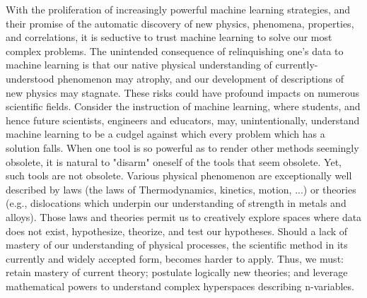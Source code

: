 With the proliferation of increasingly powerful machine learning strategies, and their promise of the automatic discovery of new physics, phenomena, properties, and correlations, it is seductive to trust machine learning to solve our most complex problems. The unintended consequence of relinquishing one's data to machine learning is that our native physical understanding of currently-understood phenomenon may atrophy, and our development of descriptions of new physics may stagnate.  These risks could have profound impacts on numerous scientific fields. Consider the instruction of machine learning, where students, and hence future scientists, engineers and educators, may, unintentionally, understand machine learning to be a cudgel against which every problem which has a solution falls. When one tool is so powerful as to render other methods seemingly obsolete, it is natural to "disarm" oneself of the tools that seem obsolete.  Yet, such tools are not obsolete.  Various physical phenomenon are exceptionally well described by laws (the laws of Thermodynamics, kinetics, motion, ...) or theories (e.g., dislocations which underpin our understanding of strength in metals and alloys).  Those laws and theories permit us to creatively explore spaces where data does not exist, hypothesize, theorize, and test our hypotheses.  Should a lack of mastery of our understanding of physical processes, the scientific method in its currently and widely accepted form, becomes harder to apply.  Thus, we must: retain mastery of current theory; postulate logically new theories; and leverage mathematical powers to understand complex hyperspaces describing n-variables. \\

